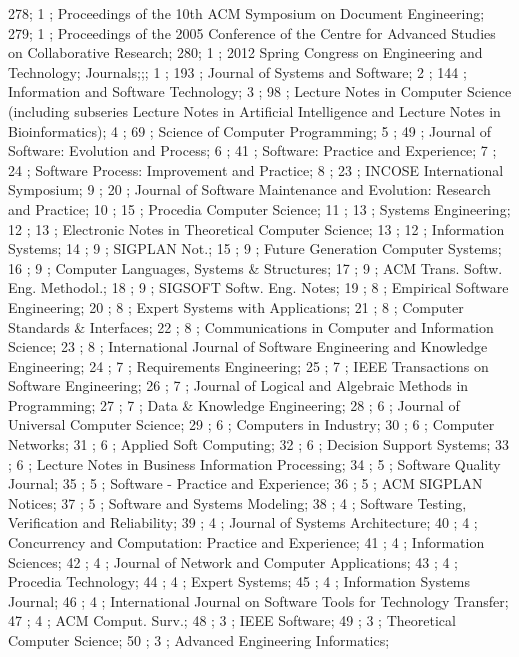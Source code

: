278; 1 ; Proceedings of the 10th ACM Symposium on Document Engineering; 
279; 1 ; Proceedings of the 2005 Conference of the Centre for Advanced Studies on Collaborative Research; 
280; 1 ; 2012 Spring Congress on Engineering and Technology; 
Journals;;;
1 ; 193 ; Journal of Systems and Software; 
2 ; 144 ; Information and Software Technology; 
3 ; 98 ; Lecture Notes in Computer Science (including subseries Lecture Notes in Artificial Intelligence and Lecture Notes in Bioinformatics); 
4 ; 69 ; Science of Computer Programming; 
5 ; 49 ; Journal of Software: Evolution and Process; 
6 ; 41 ; Software: Practice and Experience; 
7 ; 24 ; Software Process: Improvement and Practice; 
8 ; 23 ; INCOSE International Symposium; 
9 ; 20 ; Journal of Software Maintenance and Evolution: Research and Practice; 
10 ; 15 ; Procedia Computer Science; 
11 ; 13 ; Systems Engineering; 
12 ; 13 ; Electronic Notes in Theoretical Computer Science; 
13 ; 12 ; Information Systems; 
14 ; 9 ; SIGPLAN Not.; 
15 ; 9 ; Future Generation Computer Systems; 
16 ; 9 ; Computer Languages, Systems {\&} Structures; 
17 ; 9 ; ACM Trans. Softw. Eng. Methodol.; 
18 ; 9 ; SIGSOFT Softw. Eng. Notes; 
19 ; 8 ; Empirical Software Engineering; 
20 ; 8 ; Expert Systems with Applications; 
21 ; 8 ; Computer Standards {\&} Interfaces; 
22 ; 8 ; Communications in Computer and Information Science; 
23 ; 8 ; International Journal of Software Engineering and Knowledge Engineering; 
24 ; 7 ; Requirements Engineering; 
25 ; 7 ; IEEE Transactions on Software Engineering; 
26 ; 7 ; Journal of Logical and Algebraic Methods in Programming; 
27 ; 7 ; Data {\&} Knowledge Engineering; 
28 ; 6 ; Journal of Universal Computer Science; 
29 ; 6 ; Computers in Industry; 
30 ; 6 ; Computer Networks; 
31 ; 6 ; Applied Soft Computing; 
32 ; 6 ; Decision Support Systems; 
33 ; 6 ; Lecture Notes in Business Information Processing; 
34 ; 5 ; Software Quality Journal; 
35 ; 5 ; Software - Practice and Experience; 
36 ; 5 ; ACM SIGPLAN Notices; 
37 ; 5 ; Software and Systems Modeling; 
38 ; 4 ; Software Testing, Verification and Reliability; 
39 ; 4 ; Journal of Systems Architecture; 
40 ; 4 ; Concurrency and Computation: Practice and Experience; 
41 ; 4 ; Information Sciences; 
42 ; 4 ; Journal of Network and Computer Applications; 
43 ; 4 ; Procedia Technology; 
44 ; 4 ; Expert Systems; 
45 ; 4 ; Information Systems Journal; 
46 ; 4 ; International Journal on Software Tools for Technology Transfer; 
47 ; 4 ; ACM Comput. Surv.; 
48 ; 3 ; IEEE Software; 
49 ; 3 ; Theoretical Computer Science; 
50 ; 3 ; Advanced Engineering Informatics; 
